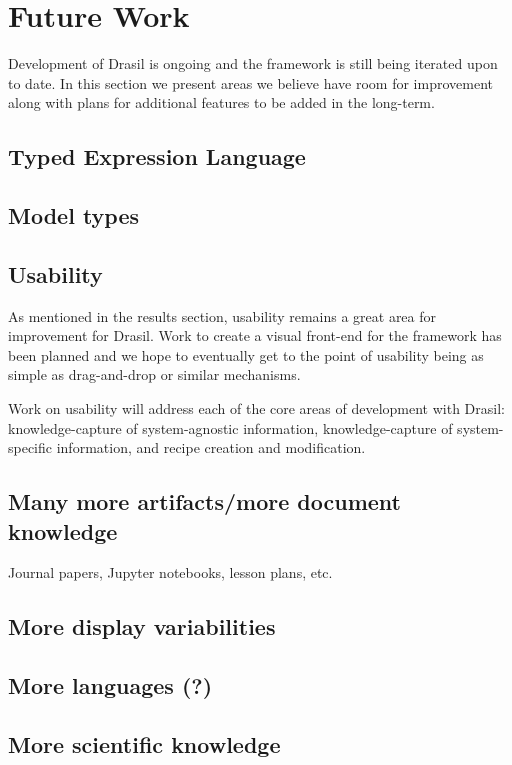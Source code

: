 \chapter{Future Work}
\label{c:future}

Development of Drasil is ongoing and the framework is still being iterated upon
to date. In this section we present areas we believe have room for improvement
along with plans for additional features to be added in the long-term.

\section{Typed Expression Language}

\section{Model types}

\section{Usability}
As mentioned in the results section, usability remains a great area for
improvement for Drasil. Work to create a visual front-end for the framework
has been planned and we hope to eventually get to the point of usability being
as simple as drag-and-drop or similar mechanisms.

Work on usability will address each of the core areas of development with
Drasil: knowledge-capture of system-agnostic information,
knowledge-capture of system-specific information, and recipe creation and
modification.
\section{Many more artifacts/more document knowledge}

Journal papers, Jupyter notebooks, lesson plans, etc.

\section{More display variabilities}

\section{More languages (?)}

\section{More scientific knowledge}

